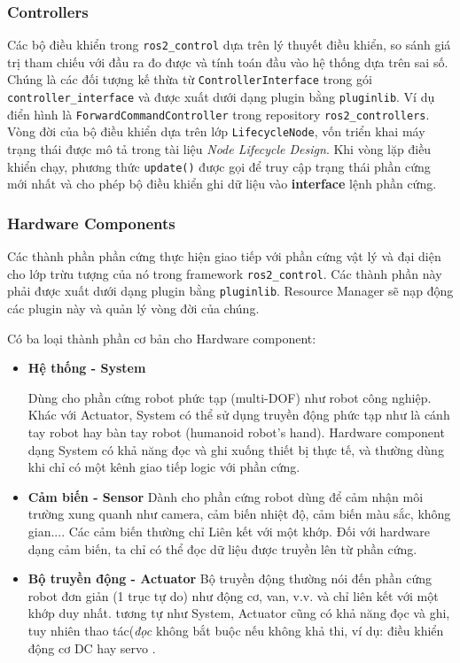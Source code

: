 \subsubsection{Controllers}
Các bộ điều khiển trong \texttt{ros2\_control} dựa trên lý thuyết điều khiển, so sánh giá trị tham chiếu với đầu ra đo được và tính toán đầu vào hệ thống dựa trên sai số. Chúng là các đối tượng kế thừa từ \texttt{ControllerInterface} trong gói \texttt{controller\_interface} và được xuất dưới dạng plugin bằng \texttt{pluginlib}. Ví dụ điển hình là \texttt{ForwardCommandController} trong repository \texttt{ros2\_controllers}. Vòng đời của bộ điều khiển dựa trên lớp \texttt{LifecycleNode}, vốn triển khai máy trạng thái được mô tả trong tài liệu \textit{Node Lifecycle Design}. Khi vòng lặp điều khiển chạy, phương thức \texttt{update()} được gọi để truy cập trạng thái phần cứng mới nhất và cho phép bộ điều khiển ghi dữ liệu vào \textbf{interface} lệnh phần cứng.

\subsubsection{Hardware Components}
Các thành phần phần cứng thực hiện giao tiếp với phần cứng vật lý và đại diện cho lớp trừu tượng của nó trong framework \texttt{ros2\_control}. 
Các thành phần này phải được xuất dưới dạng plugin bằng \texttt{pluginlib}. 
Resource Manager sẽ nạp động các plugin này và quản lý vòng đời của chúng.

Có ba loại thành phần cơ bản cho Hardware component:

\begin{itemize}
\item \textbf{{Hệ thống - System}}

Dùng cho phần cứng robot phức tạp (multi-DOF) như robot công nghiệp. Khác với Actuator, System có thể sử dụng truyền động phức tạp như là cánh tay robot hay bàn tay robot (humanoid robot's hand). Hardware component dạng System có khả năng đọc và ghi xuống thiết bị thực tế, và thường dùng khi chỉ có một kênh giao tiếp logic với phần cứng.

\item \textbf{{Cảm biến - Sensor}}
Dành cho phần cứng robot dùng để cảm nhận môi trường xung quanh như camera, cảm biến nhiệt độ, cảm biến màu sắc, không gian.... Các cảm biến thường chỉ Liên kết với một khớp. Đối với hardware dạng cảm biến, ta chỉ có thể đọc dữ liệu được truyền lên từ phần cứng.

\item \textbf{{Bộ truyền động - Actuator}}
Bộ truyền động thường nói đến phần cứng robot đơn giản (1 trục tự do) như động cơ, van, v.v.  và chỉ liên kết với một khớp duy nhất. 
tương tự như System, Actuator cũng có khả năng đọc và ghi, tuy nhiên thao tác(\textit{đọc} không bắt buộc nếu không khả thi, ví dụ: điều khiển động cơ DC hay servo .
\end{itemize}

